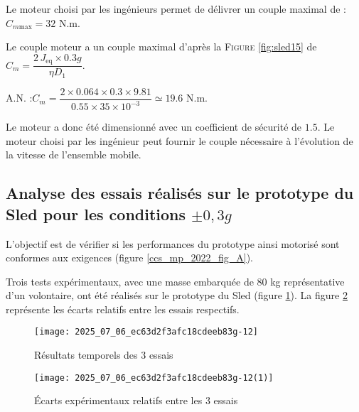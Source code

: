 \ifprof
\begin{corrige}
Le moteur choisi par les ingénieurs permet de délivrer un couple maximal de : $C_{m\text{max}} = 32$ N.m.

Le couple moteur a un couple maximal d'après la \textsc{Figure} \ref{fig:sled15} de $C_m = \dfrac{2 \, J_\text{eq} \times 0.3 g}{\eta D_1}$.

A.N. :$ C_m = \dfrac{2 \times 0.064 \times 0.3 \times 9.81}{0.55 \times 35 \times 10^{-3}} \simeq 19.6 \text{ N.m}$.

Le moteur a donc été dimensionné avec un coefficient de sécurité de $1.5$. Le moteur choisi par les ingénieur peut fournir le couple nécessaire à l'évolution de la vitesse de l'ensemble mobile.
\end{corrige}
\else
\fi


\subsection{Analyse des essais réalisés sur le prototype du Sled pour les conditions $\pm 0,3 g$}

\begin{obj}
L'objectif est de vérifier si les performances du prototype ainsi motorisé sont conformes aux exigences (figure \ref{ccs_mp_2022_fig_A}).
\end{obj}
\ifprof
\else


Trois tests expérimentaux, avec une masse embarquée de 80 kg représentative d'un volontaire, ont été réalisés sur le prototype du Sled (figure \ref{ccs_mp_2022_fig_16}). La figure \ref{ccs_mp_2022_fig_17} représente les écarts relatifs entre les essais respectifs.\\


\begin{figure}[!h]
\centering
\texttt{[image: 2025\_07\_06\_ec63d2f3afc18cdeeb83g-12]}
\caption{\label{ccs_mp_2022_fig_16}Résultats temporels des 3 essais}
\end{figure}


\begin{figure}[!h]
\centering\texttt{[image: 2025\_07\_06\_ec63d2f3afc18cdeeb83g-12(1)]}
\caption{\label{ccs_mp_2022_fig_17}Écarts expérimentaux relatifs entre les 3 essais}
\end{figure}



